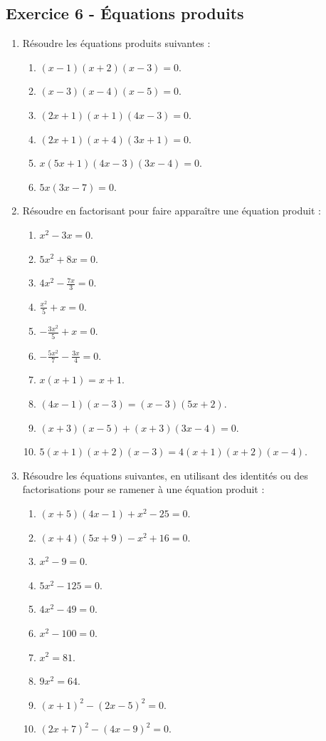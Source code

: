 \documentclass[12 pt]{extarticle}
\theoremstyle{plain}
\begin{document}
\subsection*{Exercice 6 - Équations produits}
\begin{enumerate}
\item Résoudre les équations produits suivantes :
\begin{enumerate}
\item $(x-1)(x+2)(x-3)=0$. 
\item $(x-3)(x-4)(x-5)=0$. 
\item $(2x+1)(x+1)(4x-3) = 0$.
\item $(2x+1)(x+4)(3x+1)=0$. 
\item $x(5x+1)(4x-3)(3x-4)=0$. 
\item $5x(3x-7)=0$. 
\end{enumerate}
\item Résoudre en factorisant pour faire apparaître une équation produit : 
\begin{enumerate}
\item $x^2-3x=0$. 
\item $5x^2+8x=0$. 
\item $4x^2-\frac{7x}3=0$. 
\item $\frac{x^2}5+x=0$.
\item $-\frac{3x^2}5 + x =0$. 
\item $-\frac{5x^2}7 - \frac{3x}4=0$. 
\item $x(x+1)=x+1$.
\item $(4x-1)(x-3)=(x-3)(5x+2)$.
\item $(x+3)(x-5)+(x+3)(3x-4)=0$.
\item $5(x+1)(x+2)(x-3)=4(x+1)(x+2)(x-4)$. 
\end{enumerate}
\item Résoudre les équations suivantes, en utilisant des identités ou des factorisations pour se ramener à une équation produit : 
\begin{enumerate}
\item $(x+5)(4x-1)+x^2-25=0$.
\item $(x+4)(5x+9)-x^2+16=0$.
\item $x^2-9=0$.
\item $5x^2-125=0$.
\item $4x^2-49=0$. 
\item $x^2-100=0$.
\item $x^2=81$.
\item $9x^2=64$. 
\item $(x+1)^2-(2x-5)^2=0$.
\item $(2x+7)^2-(4x-9)^2=0$.

\end{enumerate}
\end{enumerate}
\end{document}
